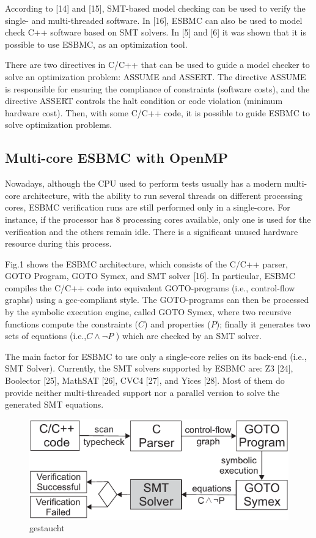According to [14] and [15], SMT-based model checking can be used to verify the single- and multi-threaded software. In [16], ESBMC can also be used to model check C++ software based on SMT solvers. In [5] and [6] it was shown that it is possible to use ESBMC, as an optimization tool.

There are two directives in C/C++ that can be used to guide a model checker to solve an optimization problem: ASSUME and ASSERT. The directive ASSUME is responsible for ensuring the compliance of constraints (software costs), and the directive ASSERT controls the halt condition or code violation (minimum hardware cost). Then, with some C/C++ code, it is possible to guide ESBMC to solve optimization problems.



\subsection{Multi-core ESBMC with OpenMP}
Nowadays, although the CPU used to perform tests usually has a modern multi-core architecture, with the ability to run several threads on different processing cores, ESBMC verification runs are still performed only in a single-core. For instance, if the processor has 8 processing cores available, only one is used for the verification and the others remain idle. There is a significant unused hardware resource during this process.

Fig.1 shows the ESBMC architecture, which consists of the C/C++ parser, GOTO Program, GOTO Symex, and SMT solver [16]. In particular, ESBMC compiles the C/C++ code into equivalent GOTO-programs (i.e., control-flow graphs) using a gcc-compliant style. The GOTO-programs can then be processed by the symbolic execution engine, called GOTO Symex, where two recursive functions compute the constraints ($ C $) and properties ($ P $); finally it generates two sets of equations (i.e.,\:$ C \land \neg P $ ) which are checked by an SMT solver. 

The main factor for ESBMC to use only a single-core relies on its back-end (i.e., SMT Solver). Currently, the SMT solvers supported by ESBMC are: Z3 [24], Boolector [25], MathSAT [26], CVC4 [27], and Yices [28]. Most of them do provide neither multi-threaded support nor a parallel version to solve the generated SMT equations.
\begin{figure}[ht]
	\centering
  \includegraphics[scale=0.9]{Image/esbmc-arch-new.pdf} 
	\caption{gestaucht}
\end{figure}

